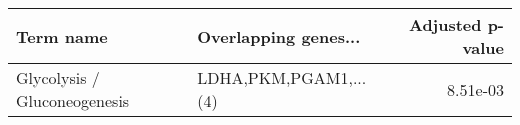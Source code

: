 \begin{tabular}{llr}
\toprule
                   Term name &  Overlapping genes... &  Adjusted p-value \\
\midrule
Glycolysis / Gluconeogenesis & LDHA,PKM,PGAM1,...(4) &          8.51e-03 \\
\bottomrule
\end{tabular}
